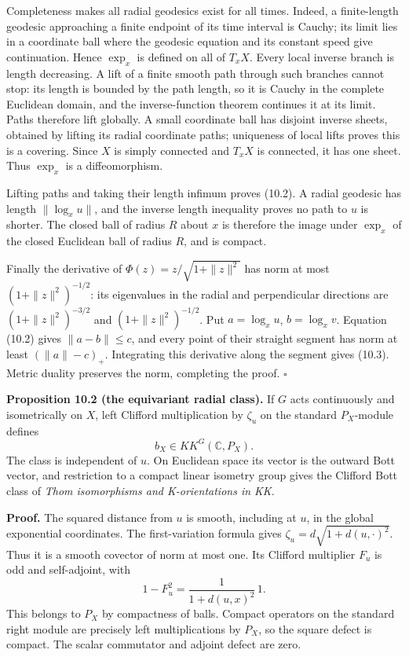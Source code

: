 \documentclass[
  11pt,
]{article}
\begin{document}
Completeness makes all radial geodesics exist for all times. Indeed, a
finite-length geodesic approaching a finite endpoint of its time
interval is Cauchy; its limit lies in a coordinate ball where the
geodesic equation and its constant speed give continuation. Hence
\(\exp_x\) is defined on all of \(T_xX\). Every local inverse branch is
length decreasing. A lift of a finite smooth path through such branches
cannot stop: its length is bounded by the path length, so it is Cauchy
in the complete Euclidean domain, and the inverse-function theorem
continues it at its limit. Paths therefore lift globally. A small
coordinate ball has disjoint inverse sheets, obtained by lifting its
radial coordinate paths; uniqueness of local lifts proves this is a
covering. Since \(X\) is simply connected and \(T_xX\) is connected, it
has one sheet. Thus \(\exp_x\) is a diffeomorphism.

Lifting paths and taking their length infimum proves (10.2). A radial
geodesic has length \(\|\log_xu\|\), and the inverse length inequality
proves no path to \(u\) is shorter. The closed ball of radius \(R\)
about \(x\) is therefore the image under \(\exp_x\) of the closed
Euclidean ball of radius \(R\), and is compact.

Finally the derivative of \(\Phi(z)=z/\sqrt{1+\|z\|^2}\) has norm at
most \((1+\|z\|^2)^{-1/2}\): its eigenvalues in the radial and
perpendicular directions are \((1+\|z\|^2)^{-3/2}\) and
\((1+\|z\|^2)^{-1/2}\). Put \(a=\log_xu\), \(b=\log_xv\). Equation
(10.2) gives \(\|a-b\|\leq c\), and every point of their straight
segment has norm at least \((\|a\|-c)_+\). Integrating this derivative
along the segment gives (10.3). Metric duality preserves the norm,
completing the proof. \(\square\)

\textbf{Proposition 10.2 (the equivariant radial class).} If \(G\) acts
continuously and isometrically on \(X\), left Clifford multiplication by
\(\zeta_u\) on the standard \(P_X\)-module defines \[
b_X\in KK^G(\mathbb C,P_X).
\tag{10.5}
\] The class is independent of \(u\). On Euclidean space its vector is
the outward Bott vector, and restriction to a compact linear isometry
group gives the Clifford Bott class of \emph{Thom isomorphisms and
K-orientations in KK}.

\textbf{Proof.} The squared distance from \(u\) is smooth, including at
\(u\), in the global exponential coordinates. The first-variation
formula gives \(\zeta_u=d\sqrt{1+d(u,\cdot)^2}\). Thus it is a smooth
covector of norm at most one. Its Clifford multiplier \(F_u\) is odd and
self-adjoint, with \[
1-F_u^2=\frac1{1+d(u,x)^2}\,1.
\tag{10.6}
\] This belongs to \(P_X\) by compactness of balls. Compact operators on
the standard right module are precisely left multiplications by \(P_X\),
so the square defect is compact. The scalar commutator and adjoint
defect are zero.
\end{document}
